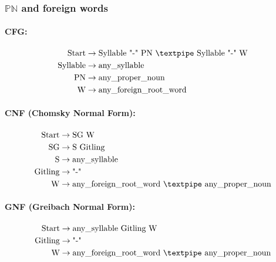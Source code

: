 \subsubsection{\(\mathbb{PN}\) and foreign words}

\paragraph{CFG:}

\begin{equation*}
    \begin{aligned}
        \text{Start}  & \rightarrow \text{Syllable "-" PN {\textpipe} Syllable "-" W}   \\
        \text{Syllable}    & \rightarrow \text{any\_syllable}\\        
        \text{PN} & \rightarrow \text{any\_proper\_noun}   \\
        \text{W} & \rightarrow \text{any\_foreign\_root\_word}   \\
    \end{aligned}
\end{equation*}

\paragraph{CNF (Chomsky Normal Form):}

\begin{equation*}
    \begin{aligned}
        \text{Start}   & \rightarrow \text{SG W} \\
        \text{SG}      & \rightarrow \text{S Gitling}\\
        \text{S}    & \rightarrow \text{any\_syllable}\\        
        \text{Gitling} & \rightarrow \text{"-"}\\
        \text{W} & \rightarrow \text{any\_foreign\_root\_word {\textpipe} any\_proper\_noun}   \\
    \end{aligned}
\end{equation*}

\paragraph{GNF (Greibach Normal Form):}

\begin{equation*}
    \begin{aligned}
        \text{Start}   & \rightarrow \text{any\_syllable Gitling W}\\
        \text{Gitling} & \rightarrow \text{"-"}\\
        \text{W} & \rightarrow \text{any\_foreign\_root\_word {\textpipe} any\_proper\_noun}   \\
    \end{aligned}
\end{equation*}